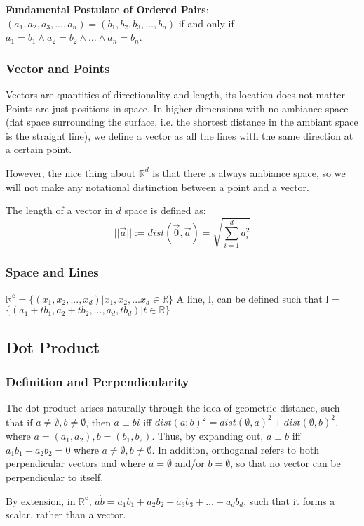 \documentclass[11 pt, twoside]{article}
\begin{document}
\textbf{Fundamental Postulate of Ordered Pairs}:
$(a_1, a_2, a_3, \dots, a_n) = (b_1, b_2, b_3, \dots, b_n)$ if and only if $a_1
= b_1 \wedge a_2 = b_2 \wedge \dots \wedge a_n = b_n$.

\subsubsection{Vector and Points}
Vectors are quantities of directionality and length, its location does not
matter. Points are just positions in space. In higher dimensions with no
ambiance space (flat space surrounding the surface, i.e. the shortest distance
in the ambiant space is the straight line),  we define a vector as all
the lines with the same direction at a certain point.

However, the nice thing about $\mathbb{R}^d$ is that there is always ambiance
space, so we will not make any notational distinction between a point and a
vector.

The length of a vector in $d$ space is defined as:
$$||\vec{a}|| := dist(\vec{0}, \vec{a}) = \sqrt{\sum_{i =
1}^d a_i^2}$$

\subsubsection{Space and Lines}
$\mathbb{R^d} = \{(x_1, x_2, ..., x_d)|x_1, x_2, ... x_d \in \mathbb{R}\}$
A line, l, can be defined such that l = $\{(a_1 + tb_1, a_2 + tb_2, ..., a_d, tb_d)|t \in \mathbb{R}\}$

\subsection{Dot Product}
\subsubsection{Definition and Perpendicularity}
The dot product arises naturally through the idea of geometric distance, such that if $a \neq \emptyset, b \neq \emptyset$, then $a \perp bi$ iff $dist(a; b)^2 = dist(\emptyset, a)^2 + dist(\emptyset, b)^2$, where $a = (a_1, a_2), b = (b_1, b_2)$. Thus, by expanding out, $a \perp b$ iff $a_1b_1 + a_2b_2 = 0$ where $a \neq \emptyset, b \neq \emptyset$. In addition, orthoganal refers to both perpendicular vectors and where $a = \emptyset$ and/or $b = \emptyset$, so that no vector can be perpendicular to itself.

By extension, in $\mathbb{R^d}$, $a \dot b = a_1b_1 + a_2b_2 + a_3b_3 +...+ a_db_d$, such that it forms a scalar, rather than a vector.
\end{document}
